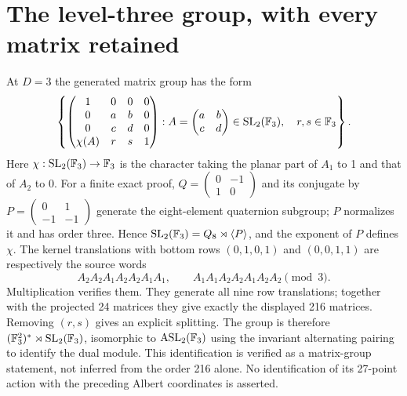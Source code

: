 \section{The level-three group, with every matrix retained}
At $D=3$ the generated matrix group has the form
\[
 \left\{
 \begin{pmatrix}1&0&0&0\\0&a&b&0\\0&c&d&0\\\chi(A)&r&s&1\end{pmatrix}:
 A=\begin{pmatrix}a&b\\c&d\end{pmatrix}\in\mathrm{SL}_2(\mathbb F_3),\quad
 r,s\in\mathbb F_3\right\}.
\]
Here $\chi:\mathrm{SL}_2(\mathbb F_3)\to\mathbb F_3$ is the character taking the planar
part of $A_1$ to 1 and that of $A_2$ to 0. For a finite exact proof,
$Q=\left(\begin{smallmatrix}0&-1\\1&0\end{smallmatrix}\right)$ and its
conjugate by $P=\left(\begin{smallmatrix}0&1\\-1&-1\end{smallmatrix}\right)$
generate the eight-element quaternion subgroup; $P$ normalizes it and
has order three. Hence $\mathrm{SL}_2(\mathbb F_3)=Q_8\rtimes\langle P\rangle$,
and the exponent of $P$ defines $\chi$.
The kernel translations with bottom rows $(0,1,0,1)$ and $(0,0,1,1)$
are respectively the source words
\[
 A_2A_2A_1A_2A_2A_1A_1,\qquad
 A_1A_1A_2A_2A_1A_2A_2 \pmod3.
\]
Multiplication verifies them. They generate all nine row translations;
together with the projected 24 matrices they give exactly the displayed
216 matrices. Removing $(r,s)$ gives an explicit splitting. The group
is therefore $(\mathbb F_3^2)^*\rtimes\mathrm{SL}_2(\mathbb F_3)$, isomorphic to
$\mathrm{ASL}_2(\mathbb F_3)$ using the invariant alternating pairing to identify
the dual module. This identification is verified as a matrix-group
statement, not inferred from the order 216 alone. No identification of
its 27-point action with the preceding Albert coordinates is asserted.
